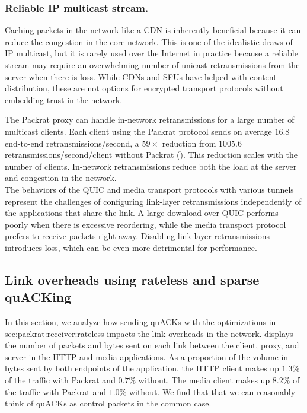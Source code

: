 \subsubsection{Reliable IP multicast stream.}

Caching packets in the network like a CDN is inherently beneficial because it
can reduce the congestion in the core network. This is one of the idealistic
draws of IP multicast, but it is rarely used over the Internet in practice
because a reliable stream may require an overwhelming number of unicast
retransmissions from the server when there is loss. While CDNs and SFUs have
helped with content distribution, these are not options for encrypted transport
protocols without embedding trust in the network.

The Packrat proxy can handle in-network retransmissions for a large number of
multicast clients. Each client using the Packrat protocol sends on average $16.8$
end-to-end retransmissions/second, a $59\!\times$ reduction from $1005.6$
retransmissions/second/client without Packrat ().
This reduction scales with the
number of clients. In-network retransmissions reduce both the load at the
server and congestion in the network.\\

\noindent
The behaviors of the QUIC and media transport protocols with various tunnels
represent the challenges of configuring link-layer retransmissions
independently of the applications that share the link. A large download
over QUIC performs poorly
when there is excessive reordering, while the media transport protocol prefers
to receive packets right away.
Disabling link-layer retransmissions introduces loss, which can be even more
detrimental for performance.

\subsection{Link overheads using rateless and sparse quACKing}
\label{sec:packrat:emulation:link-overheads}



In this section, we analyze how sending quACKs with the optimizations in \Cref
{sec:packrat:receiver:rateless} impacts the link overheads in the network.
 displays the number of packets and bytes sent on each
link between the client, proxy, and server in the HTTP and media applications.
As a proportion of the volume in bytes sent by both endpoints of the
application, the HTTP client makes up $1.3\%$ of the traffic with Packrat and
$0.7\%$ without. The media client makes up $8.2\%$ of the traffic with Packrat
and $1.0\%$ without. We find that that we can reasonably think of quACKs as
control packets in the common case.

